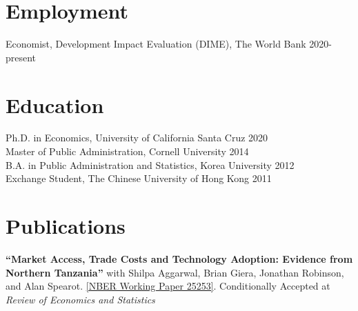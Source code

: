 \documentclass[letterpaper, margin, 10pt]{res} %
\begin{document}
\begin{resume}


 




%


\section{\sc \textbf{Employment}}
Economist, Development Impact Evaluation (DIME), The World Bank \hfill{2020-present}

\section{\sc \textbf{Education}}
{Ph.D. in Economics, University of California Santa Cruz} \hfill 2020\\
{Master of Public Administration, Cornell University} \hfill 2014\\
{B.A. in Public Administration and Statistics, Korea University} \hfill 2012\\
{ Exchange Student, The Chinese University of Hong Kong} \hfill 2011




\normalsize\section{\textbf{Publications}}

\normalsize
{\bf ``{Market Access, Trade Costs and Technology Adoption: Evidence from Northern Tanzania}''} with Shilpa Aggarwal, Brian Giera, Jonathan Robinson, and Alan Spearot. \href{https://www.nber.org/papers/w25253.pdf}{[NBER Working Paper 25253]}. Conditionally Accepted at \textit{Review of Economics and Statistics}


\end{resume}
\end{document}
